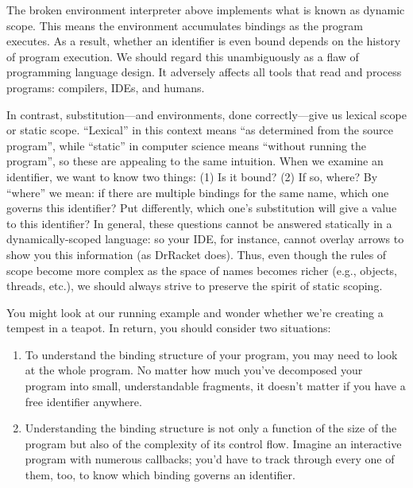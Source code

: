 
The broken environment interpreter above implements what is known as dynamic
scope. This means the environment accumulates bindings as the program executes.
As a result, whether an identifier is even bound depends on the history of
program execution. We should regard this unambiguously as a flaw of programming
language design. It adversely affects all tools that read and process programs:
compilers, IDEs, and humans.

In contrast, substitution—and environments, done correctly—give us lexical scope
or static scope. “Lexical” in this context means “as determined from the source
program”, while “static” in computer science means “without running the
program”, so these are appealing to the same intuition. When we examine an
identifier, we want to know two things: (1) Is it bound? (2) If so, where? By
“where” we mean: if there are multiple bindings for the same name, which one
governs this identifier? Put differently, which one’s substitution will give a
value to this identifier? In general, these questions cannot be answered
statically in a dynamically-scoped language: so your IDE, for instance, cannot
overlay arrows to show you this information (as DrRacket does). Thus, even
though the rules of scope become more complex as the space of names becomes
richer (e.g., objects, threads, etc.), we should always strive to preserve the
spirit of static scoping.

\secdown
{}

You might look at our running example and wonder whether we’re creating a
tempest in a teapot. In return, you should consider two situations:
\begin{enumerate}

\item To understand the binding structure of your program, you may need to look
at the whole program. No matter how much you’ve decomposed your program into
small, understandable fragments, it doesn’t matter if you have a free identifier
anywhere.

\item Understanding the binding structure is not only a function of the size of
the program but also of the complexity of its control flow. Imagine an
interactive program with numerous callbacks; you’d have to track through every
one of them, too, to know which binding governs an identifier.

\end{enumerate}

